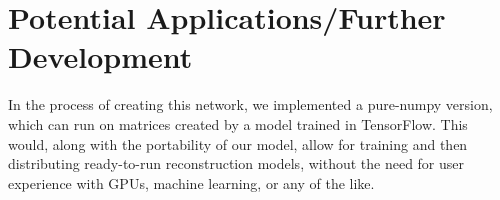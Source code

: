 \section{Potential Applications/Further Development}

In the process of creating this network, we implemented a pure-numpy version, 
which can run on matrices created by a model trained in TensorFlow. This would, 
along with the portability of our model, allow for training and then 
distributing ready-to-run reconstruction models, without the need for user 
experience with GPUs, machine learning, or any of the like.
